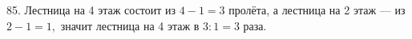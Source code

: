 85. Лестница на 4 этаж состоит из $4-1=3$ пролёта, а лестница на 2 этаж --- из $2-1=1,$ значит лестница на 4 этаж в $3:1=3$ раза.\\
